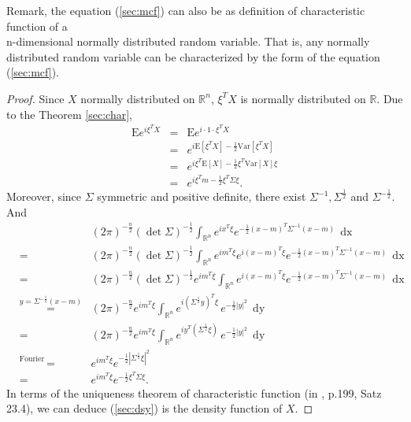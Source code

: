 \documentclass[a4paper, twoside, 11pt]{article}
\theoremstyle{definition}
\newcommand{\sqbr}[1]{\left[ {#1} \right]}
\begin{document}
  Remark, the equation (\ref{sec:mcf}) can also be as definition of characteristic function of a \\n-dimensional normally distributed random variable. That is, any normally distributed random variable can be characterized by the form of the equation (\ref{sec:mcf}).

  \begin{proof}
	Since $X$ normally distributed on $\mathbb{R}^{n}$,  $\xi^T X$ is normally distributed on $\mathbb{R}$. Due to the Theorem \ref{sec:char},
	\begin{eqnarray*}
	  \mathrm{E} e^{i\xi^T X} &=& \mathrm{E} e^{i\cdot 1 \cdot \xi^T X}\\
							  &=& e^{i\mathrm{E}\sqbr{\xi^T X} -\frac{1}{2}\mathrm{Var}\sqbr{\xi^T X}}\\
							  &=& e^{i\xi^T\mathrm{E}\sqbr{X} - \frac{1}{2}\xi^T \mathrm{Var}\sqbr{X} \xi}\\
							  &=& e^{i\xi^Tm - \frac{1}{2}\xi^T \Sigma \xi}.
	\end{eqnarray*}
	Moreover, since $\Sigma$ symmetric and positive definite, there exist $\Sigma^{-1}, \Sigma^{\frac{1}{2}}$ and $\Sigma^{-\frac{1}{2}}$. And
	\begin{eqnarray*}
	  &&(2\pi)^{-\frac{n}{2}} (\det\Sigma) ^{-\frac{1}{2}}\int_{\mathbb{R}^{n}} e^{i x^T \xi}e^{-\frac{1}{2}(x-m)^T\Sigma^{-1}(x-m)}\, \mathop{dx}\\
	  &=& (2\pi)^{-\frac{n}{2}} (\det\Sigma) ^{-\frac{1}{2}}\int_{\mathbb{R}^{n}} e^{im^T\xi} e^{i (x-m)^T \xi}e^{-\frac{1}{2}(x-m)^T\Sigma^{-1}(x-m)}\, \mathop{dx} \\
	  &=& (2\pi)^{-\frac{n}{2}} (\det\Sigma) ^{-\frac{1}{2}}  e^{im^T\xi} \int_{\mathbb{R}^{n}} e^{i (x-m)^T \xi}e^{-\frac{1}{2}(x-m)^T\Sigma^{-1}(x-m)}\, \mathop{dx} \\
	  &\overset{y=\Sigma^{-\frac{1}{2}}(x-m)}{=}& (2\pi)^{-\frac{n}{2}} e^{im^T\xi} \int_{\mathbb{R}^{n}}e^{i (\Sigma^{\frac{1}{2}}y)^T \xi}\,e^{-\frac{1}{2}|y|^2}\, \mathop{dy}\\
	  &=& (2\pi)^{-\frac{n}{2}} e^{im^T\xi}  \int_{\mathbb{R}^{n}}e^{i y^T (\Sigma^{\frac{1}{2}}\xi)}\,e^{-\frac{1}{2}|y|^2}\, \mathop{dy}\\
	  &\overset{\text{Fourier transformation}}{=}& e^{im^T\xi}  e^{-\frac{1}{2}|\Sigma^{\frac{1}{2}}\xi|^2}\\
	  &=& e^{im^T\xi}  e^{-\frac{1}{2}\xi^T\Sigma\xi}.
	\end{eqnarray*}
	In terms of the uniqueness theorem of characteristic function (in \cite{bauer}, p.199, Satz 23.4), we can deduce (\ref{sec:dsy}) is the density function of $X$.
  \end{proof}
\end{document}
